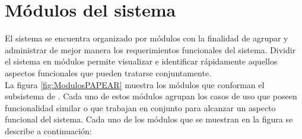 \section{Módulos del sistema}

El sistema se encuentra organizado por módulos con la finalidad de agrupar y administrar de mejor manera los requerimientos funcionales del sistema. 
Dividir el sistema en módulos permite visualizar e identificar rápidamente aquellos aspectos funcionales que pueden tratarse conjuntamente. \\

La figura \ref{fig:ModulosPAPEAR} muestra los módulos que conforman el subsistema de \gie. Cada uno de estos módulos agrupan los casos de uso que poseen funcionalidad similar o que trabajan en conjunto para alcanzar un aspecto funcional del sistema. Cada uno de los módulos que se muestran en la figura se describe a continuación:



